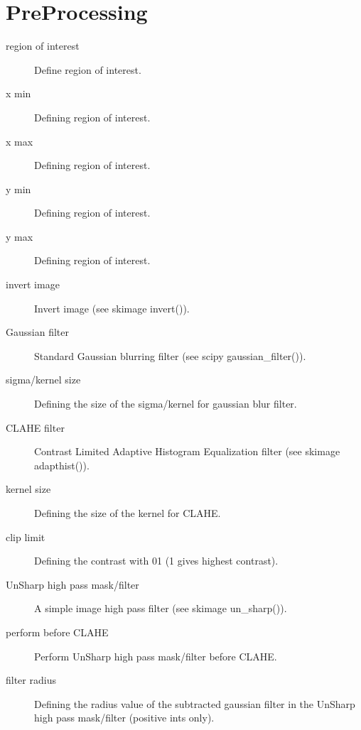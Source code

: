 \documentclass[letterpaper,10pt,english]{sphinxmanual}
\begin{document}
\section{Pre\sphinxhyphen{}Processing}
\label{\detokenize{parameters:pre-processing}}\begin{description}
\item[{region of interest}] \leavevmode
Define region of interest.

\item[{x min}] \leavevmode
Defining region of interest.

\item[{x max}] \leavevmode
Defining region of interest.

\item[{y min}] \leavevmode
Defining region of interest.

\item[{y max}] \leavevmode
Defining region of interest.

\item[{invert image}] \leavevmode
Invert image (see skimage invert()).

\item[{Gaussian filter}] \leavevmode
Standard Gaussian blurring filter (see scipy gaussian\_filter()).

\item[{sigma/kernel size}] \leavevmode
Defining the size of the sigma/kernel for gaussian blur filter.

\item[{CLAHE filter}] \leavevmode
Contrast Limited Adaptive Histogram Equalization filter (see skimage adapthist()).

\item[{kernel size}] \leavevmode
Defining the size of the kernel for CLAHE.

\item[{clip limit}] \leavevmode
Defining the contrast with 0\sphinxhyphen{}1 (1 gives highest contrast).

\item[{UnSharp high pass mask/filter}] \leavevmode
A simple image high pass filter (see skimage un\_sharp()).

\item[{perform before CLAHE}] \leavevmode
Perform UnSharp high pass mask/filter before CLAHE.

\item[{filter radius}] \leavevmode
Defining the radius value of the subtracted gaussian filter in the UnSharp high pass mask/filter (positive ints only).


\end{description}
\end{document}
